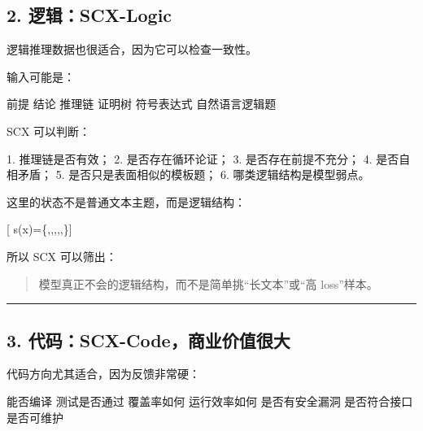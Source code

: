 \documentclass[
  12pt,
]{ctexart}
\newenvironment{Shaded}{}{}
\newcommand{\NormalTok}[1]{#1}
\begin{document}
\subsection{2. 逻辑：SCX-Logic}\label{ux903bux8f91scx-logic}

逻辑推理数据也很适合，因为它可以检查一致性。

输入可能是：

\begin{Shaded}
\begin{Highlighting}[]
\NormalTok{前提}
\NormalTok{结论}
\NormalTok{推理链}
\NormalTok{证明树}
\NormalTok{符号表达式}
\NormalTok{自然语言逻辑题}
\end{Highlighting}
\end{Shaded}

SCX 可以判断：

\begin{Shaded}
\begin{Highlighting}[]
\NormalTok{1. 推理链是否有效；}
\NormalTok{2. 是否存在循环论证；}
\NormalTok{3. 是否存在前提不充分；}
\NormalTok{4. 是否自相矛盾；}
\NormalTok{5. 是否只是表面相似的模板题；}
\NormalTok{6. 哪类逻辑结构是模型弱点。}
\end{Highlighting}
\end{Shaded}

这里的状态不是普通文本主题，而是逻辑结构：

{[}
s(x)=\{,,,,,\}{]}

所以 SCX 可以筛出：

\begin{quote}
模型真正不会的逻辑结构，而不是简单挑``长文本''或``高 loss''样本。
\end{quote}

\begin{center}\rule{0.5\linewidth}{0.5pt}\end{center}

\subsection{3.
代码：SCX-Code，商业价值很大}\label{ux4ee3ux7801scx-codeux5546ux4e1aux4ef7ux503cux5f88ux5927}

代码方向尤其适合，因为反馈非常硬：

\begin{Shaded}
\begin{Highlighting}[]
\NormalTok{能否编译}
\NormalTok{测试是否通过}
\NormalTok{覆盖率如何}
\NormalTok{运行效率如何}
\NormalTok{是否有安全漏洞}
\NormalTok{是否符合接口}
\NormalTok{是否可维护}
\end{Highlighting}
\end{Shaded}
\end{document}
